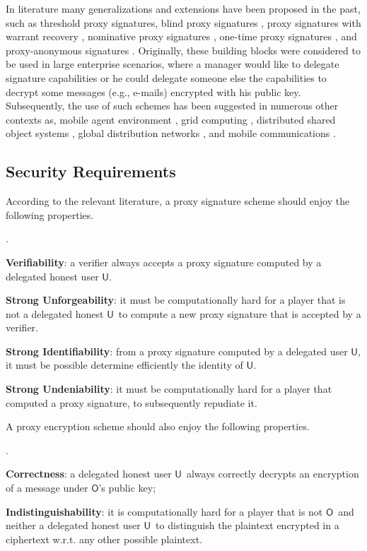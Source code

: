 \documentclass{sig-alternate}
\newcommand{\Owner}{\ensuremath{\mathsf{O}}}
\newcommand{\User}{\ensuremath{\mathsf{U}}}
\newcounter{itemcount}
\newenvironment{myenumerate}
{\setcounter{itemcount}{0}\begin{list}
{\arabic{itemcount}.}{\usecounter{itemcount} \itemindent=0.0cm
\itemsep=0.0in
\parsep=0.0in
\topsep=0.0in
\partopsep=0.0in}}{\end{list}}
\begin{document}
In literature many generalizations and extensions have been proposed in the past, such as threshold proxy signatures\cite{DBLP:journals/jss/ShaoCL07}, blind proxy signatures \cite{DBLP:conf/ism/KimC06,DBLP:conf/snpd/LiuTLZ07,DBLP:conf/csse/QinW08}, proxy signatures with warrant recovery \cite{cryptoeprint:2003:072}, nominative proxy signatures \cite{DBLP:conf/icics/ParkL01}, one-time proxy signatures \cite{DBLP:conf/cans/LuCD06}, and proxy-anonymous signatures \cite{DBLP:conf/icycs/FanZL08,DBLP:conf/scn/FuchsbauerP08,DBLP:conf/snpd/HuL07,DBLP:conf/mcam/HuLL07,DBLP:conf/iscis/Yumin06,DBLP:conf/csse/ZhouW08a}.
Originally, these building blocks were considered to be used in large enterprise scenarios, where a manager would like to delegate signature capabilities or he could delegate someone else the capabilities to decrypt some messages (e.g., e-mails) encrypted with his public key. Subsequently,  the use of such schemes has been suggested in numerous other contexts as, mobile agent environment \cite{DBLP:conf/acisp/LeeKK01}, grid computing \cite{DBLP:conf/ccs/FosterKTT98}, distributed shared object systems \cite{DBLP:conf/sec/LeiwoHHT00}, global distribution networks \cite{DBLP:conf/nca/BakkerST01}, and mobile communications \cite{DBLP:conf/icics/ParkL01}.


\subsection{Security Requirements}
According to the relevant literature, a proxy signature scheme should enjoy the following properties. 
\begin{myenumerate} 
\item {\bf Verifiability}: a verifier always accepts a proxy signature computed by a delegated honest user \User.
\item  {\bf Strong Unforgeability}: it must be computationally hard for a player that is not a delegated honest \User\ to compute a new proxy signature that is accepted by a verifier.
\item {\bf Strong Identifiability}: from a proxy signature computed by a delegated user \User, it must be possible determine efficiently the identity of \User.
\item {\bf Strong Undeniability}:
it must be computationally hard for a player that computed a proxy signature, to subsequently repudiate it.
\end{myenumerate}

A proxy encryption scheme should also enjoy the following properties. 
\begin{myenumerate}
\item {\bf Correctness}: a delegated honest user \User\ always correctly decrypts an encryption of a message under \Owner's public key; 
\item {\bf Indistinguishability}: it is computationally hard for a player that is not \Owner\ and neither a delegated honest user
\User\ to distinguish the plaintext encrypted in a ciphertext w.r.t. any other possible plaintext.
\end{myenumerate}
\end{document}
